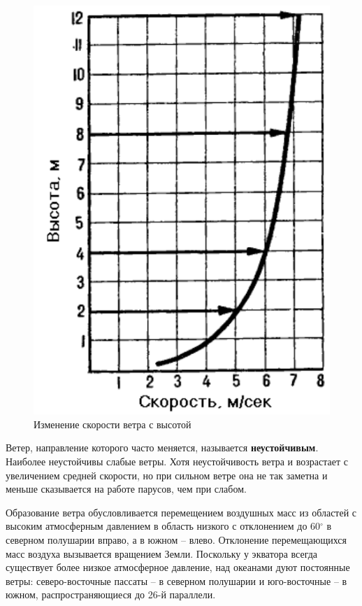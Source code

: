 \documentclass[a4paper, 12pt, twoside, final]{scrbook}
\begin{document}
\begin{figure}
	\centering
	\includegraphics[scale=1]{89_Izmenenije_skorosti_vetra_s_vysotoj}
	\caption{Изменение скорости ветра с высотой}
	\label{fig:89}
\end{figure}

Ветер, направление которого часто меняется, называется \textbf{неустойчивым}. Наиболее неустойчивы слабые ветры. Хотя неустойчивость ветра и возрастает с увеличением средней скорости, но при сильном ветре она не так заметна и меньше сказывается на работе парусов, чем при слабом.

Образование ветра обусловливается перемещением воздушных масс из областей с высоким атмосферным давлением в область низкого с отклонением до 60$^\circ$ в северном полушарии вправо, а в южном \--- влево. Отклонение перемещающихся масс воздуха вызывается вращением Земли. Поскольку у экватора всегда существует более низкое атмосферное давление, над океанами дуют постоянные ветры: северо-восточные пассаты \--- в северном полушарии и юго-восточные \--- в южном, распространяющиеся до 26-й параллели.
\end{document}
